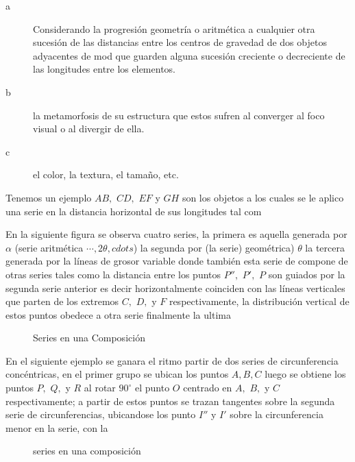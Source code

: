 \begin{description}
  \item[a] Considerando  la progresión geometría o aritmética a cualquier otra sucesión de las distancias entre los centros de gravedad de dos objetos adyacentes de mod que guarden alguna sucesión creciente o decreciente de las longitudes entre los elementos.

  \item[b] la metamorfosis de su estructura que estos sufren al converger al foco visual o al divergir de ella.

  \item[c] el color, la textura, el tamaño, etc.
\end{description}

  Tenemos un ejemplo
$AB,$ $CD,$ $EF$ y $GH$ son los objetos a los cuales se le aplico una serie en la distancia horizontal de sus longitudes tal com


En la siguiente figura se observa cuatro series, la primera es aquella generada por $\alpha$ (serie aritmética $\cdots, 2\theta, cdots$) la segunda por (la serie) geométrica) $\theta$ la tercera generada por la líneas de grosor variable donde también esta serie de compone de otras series tales como la distancia entre los puntos $P'',$ $P',$ $P$ son guiados por la segunda serie anterior es decir horizontalmente coinciden con las líneas  verticales que parten de los extremos $C,$ $D,$ y $F$ respectivamente, la distribución vertical de estos puntos  obedece a otra serie finalmente la ultima

\begin{figure}
\begin{center}

\end{center}
\caption{Series en una Composición}\label{Ogw}
\end{figure}

En el siguiente ejemplo  se ganara el ritmo partir de dos series de circunferencia  concéntricas, en el primer grupo  se ubican los puntos $A, B, C$ luego se obtiene los puntos $P,$ $Q,$ y $R$ al rotar $90^{\circ}$ el punto $O$ centrado en $A,$ $B,$ y $C$ respectivamente; a partir de estos puntos se trazan tangentes sobre la segunda serie de circunferencias, ubicandose los punto $I''$ y $I'$ sobre la circunferencia menor en la serie, con la

\begin{figure}
\begin{center}

\end{center}
\caption{series en una composición}\label{Og}
\end{figure}




